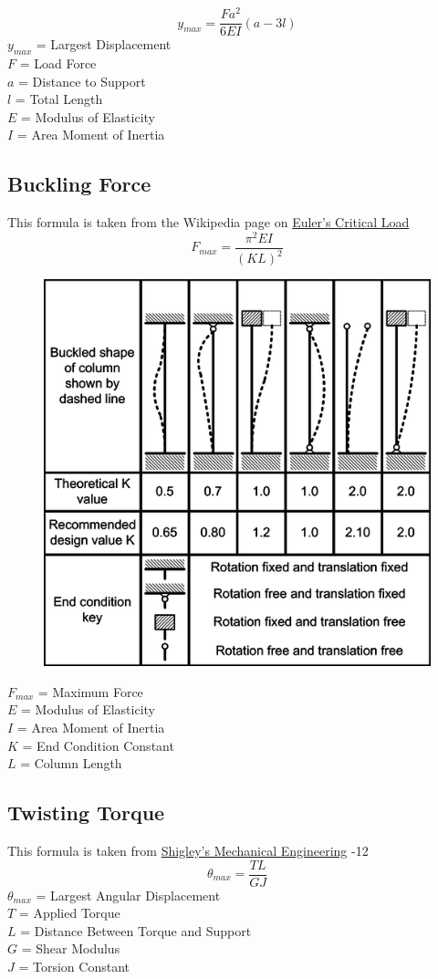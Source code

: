\documentclass[11pt,a4paper,titlepage]{article}
\begin{document}
	\begin{equation}
		y_{max} = \frac{F a^2}{6 EI} (a-3l)
	\end{equation}
	$y_{max}$ = Largest Displacement \\
	$F$ = Load Force \\
	$a$ = Distance to Support \\
	$l$ = Total Length \\
	$E$ = Modulus of Elasticity \\
	$I$ = Area Moment of Inertia
	
	\newpage
	\subsection{Buckling Force}
	This formula is taken from the Wikipedia page on  \href{https://en.wikipedia.org/wiki/Euler\%27s_critical_load}{Euler's Critical Load}
	\begin{equation}
		F_{max} = \frac{\pi^2 EI}{(KL)^2}
	\end{equation}
	\begin{figure}[H]
		\centering
		\includegraphics[width=0.5\linewidth]{"ColumnEffectiveLength"}
	\end{figure}
	$F_{max}$ = Maximum Force \\
	$E$ = Modulus of Elasticity \\
	$I$ = Area Moment of Inertia \\
	$K$ = End Condition Constant \\
	$L$ = Column Length
	
	\subsection{Twisting Torque}
	This formula is taken from \href{https://fac.ksu.edu.sa/sites/default/files/mechanical-disgin-shigley.pdf}{Shigley's Mechanical Engineering} -12
	\begin{equation}
		\theta_{max} = \frac{T L}{G J}
	\end{equation}
	$\theta_{max}$ = Largest Angular Displacement \\
	$T$ = Applied Torque \\
	$L$ = Distance Between Torque and Support \\
	$G$ = Shear Modulus \\
	$J$ = Torsion Constant
	
\end{document}
